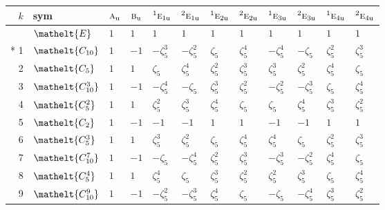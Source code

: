 \documentclass[10pt,a4paper]{article}
\numberwithin{equation}{section}
\newcommand{\eltfont}[1]{{\let\sigma\eltsigma\mathelt{#1}}}
\newcommand{\irr}[1]{\text{\normalfont\scshape #1}}
\newcommand{\conjpair}[1]{{}^{#1}}
\newcommand{\cls}[1]{\eltfont{#1}}
\newcommand{\ptag}[1]{\mathrm{#1}}
\newcommand{\rootunity}[1]{\zeta_{#1}}
\begin{document}
{\small\setlength{\tabcolsep}{4pt}
\begin{longtable}{@{}rlllllllllll@{}}\toprule
$k$ & sym & $\irr{a}_{\ptag{u}}$ & $\irr{b}_{\ptag{u}}$ & $\conjpair{1}\irr{e}_{1\ptag{u}}$ & $\conjpair{2}\irr{e}_{1\ptag{u}}$ & $\conjpair{1}\irr{e}_{2\ptag{u}}$ & $\conjpair{2}\irr{e}_{2\ptag{u}}$ & $\conjpair{1}\irr{e}_{3\ptag{u}}$ & $\conjpair{2}\irr{e}_{3\ptag{u}}$ & $\conjpair{1}\irr{e}_{4\ptag{u}}$ & $\conjpair{2}\irr{e}_{4\ptag{u}}$\\\midrule\endhead
\bottomrule\endfoot\endlastfoot
0 & $\cls{E}$ & $1$ & $1$ & $1$ & $1$ & $1$ & $1$ & $1$ & $1$ & $1$ & $1$\\*
1 & $\cls{C_{10}}$ & $1$ & $-1$ & $-\rootunity{5}^{3}$ & $-\rootunity{5}^{2}$ & $\rootunity{5}$ & $\rootunity{5}^{4}$ & $-\rootunity{5}^{4}$ & $-\rootunity{5}$ & $\rootunity{5}^{2}$ & $\rootunity{5}^{3}$\\
2 & $\cls{C_{5}}$ & $1$ & $1$ & $\rootunity{5}$ & $\rootunity{5}^{4}$ & $\rootunity{5}^{2}$ & $\rootunity{5}^{3}$ & $\rootunity{5}^{3}$ & $\rootunity{5}^{2}$ & $\rootunity{5}^{4}$ & $\rootunity{5}$\\
3 & $\cls{C_{10}^{3}}$ & $1$ & $-1$ & $-\rootunity{5}^{4}$ & $-\rootunity{5}$ & $\rootunity{5}^{3}$ & $\rootunity{5}^{2}$ & $-\rootunity{5}^{2}$ & $-\rootunity{5}^{3}$ & $\rootunity{5}$ & $\rootunity{5}^{4}$\\
4 & $\cls{C_{5}^{2}}$ & $1$ & $1$ & $\rootunity{5}^{2}$ & $\rootunity{5}^{3}$ & $\rootunity{5}^{4}$ & $\rootunity{5}$ & $\rootunity{5}$ & $\rootunity{5}^{4}$ & $\rootunity{5}^{3}$ & $\rootunity{5}^{2}$\\
5 & $\cls{C_{2}}$ & $1$ & $-1$ & $-1$ & $-1$ & $1$ & $1$ & $-1$ & $-1$ & $1$ & $1$\\
6 & $\cls{C_{5}^{3}}$ & $1$ & $1$ & $\rootunity{5}^{3}$ & $\rootunity{5}^{2}$ & $\rootunity{5}$ & $\rootunity{5}^{4}$ & $\rootunity{5}^{4}$ & $\rootunity{5}$ & $\rootunity{5}^{2}$ & $\rootunity{5}^{3}$\\
7 & $\cls{C_{10}^{7}}$ & $1$ & $-1$ & $-\rootunity{5}$ & $-\rootunity{5}^{4}$ & $\rootunity{5}^{2}$ & $\rootunity{5}^{3}$ & $-\rootunity{5}^{3}$ & $-\rootunity{5}^{2}$ & $\rootunity{5}^{4}$ & $\rootunity{5}$\\
8 & $\cls{C_{5}^{4}}$ & $1$ & $1$ & $\rootunity{5}^{4}$ & $\rootunity{5}$ & $\rootunity{5}^{3}$ & $\rootunity{5}^{2}$ & $\rootunity{5}^{2}$ & $\rootunity{5}^{3}$ & $\rootunity{5}$ & $\rootunity{5}^{4}$\\
9 & $\cls{C_{10}^{9}}$ & $1$ & $-1$ & $-\rootunity{5}^{2}$ & $-\rootunity{5}^{3}$ & $\rootunity{5}^{4}$ & $\rootunity{5}$ & $-\rootunity{5}$ & $-\rootunity{5}^{4}$ & $\rootunity{5}^{3}$ & $\rootunity{5}^{2}$\\

\end{longtable}}
\end{document}
